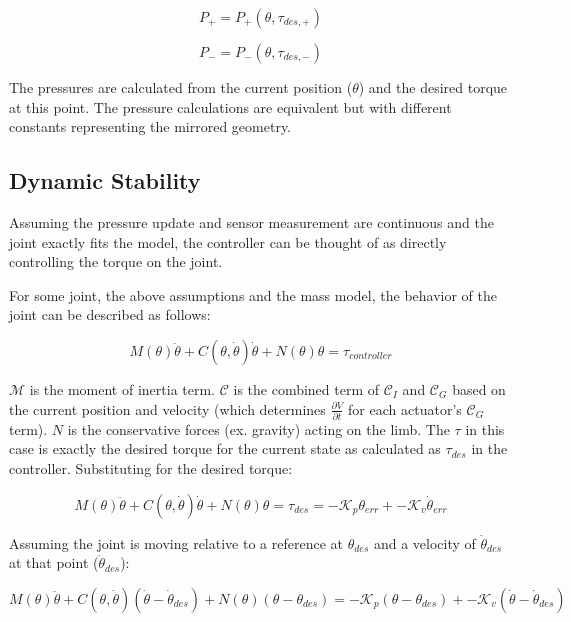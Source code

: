\documentclass[12pt, letterpaper, oneside, notitlepage, onecolumn]{article}
\newcommand{\bbss}[1]{\subsection{#1}}
\begin{document}
\begin{equation}
P_{+} = P_{+}(\theta, \tau_{des, +})
\end{equation}

\begin{equation}
P_{-} = P_{-}(\theta, \tau_{des, -})
\end{equation}

The pressures are calculated from the current position ($\theta$) and the
desired torque at this point. The pressure calculations are equivalent but with
different constants representing the mirrored geometry.

\bbss{Dynamic Stability}

Assuming the pressure update and sensor measurement are continuous and the joint
exactly fits the model, the controller can be thought of as directly controlling
the torque on the joint. 

For some joint, the above assumptions and the mass model, the behavior of the
joint can be described as follows:

\begin{equation}
M(\theta) \ddot{\theta} + C(\theta, \dot{\theta}) \dot{\theta} + N(\theta) \theta = 
\tau_{controller}
\end{equation}

$\mathcal{M}$ is the moment of inertia term. $\mathcal{C}$ is the combined term
of $\mathcal{C}_{I}$ and $\mathcal{C}_{G}$ based on the current position and
velocity (which determines $\frac{\partial V}{\partial t}$ for each actuator's
$\mathcal{C}_{G}$ term). $N$ is the conservative forces (ex. gravity) acting on
the limb. The $\tau$ in this case is exactly the desired torque for the current
state as calculated as $\tau_{des}$ in the controller. Substituting for the
desired torque:

\begin{equation}
M(\theta) \ddot{\theta} + C(\theta, \dot{\theta}) \dot{\theta} + N(\theta) \theta = 
\tau_{des} = -\mathcal{K}_{p} \theta_{err} + -\mathcal{K}_{v} \dot{\theta}_{err}
\end{equation}

Assuming the joint is moving relative to a reference at $\theta_{des}$ and a
velocity of $\dot{\theta}_{des}$ at that point ($\dot{\theta}_{des}$):

\begin{equation}
M(\theta) \ddot{\theta}
+ C(\theta, \dot{\theta}) (\dot{\theta} - \dot{\theta}_{des}) 
+ N(\theta)(\theta - \theta_{des}) = 
-\mathcal{K}_{p} (\theta - \theta_{des})
+ -\mathcal{K}_{v} (\dot{\theta} - \dot{\theta}_{des})
\end{equation}
\end{document}
